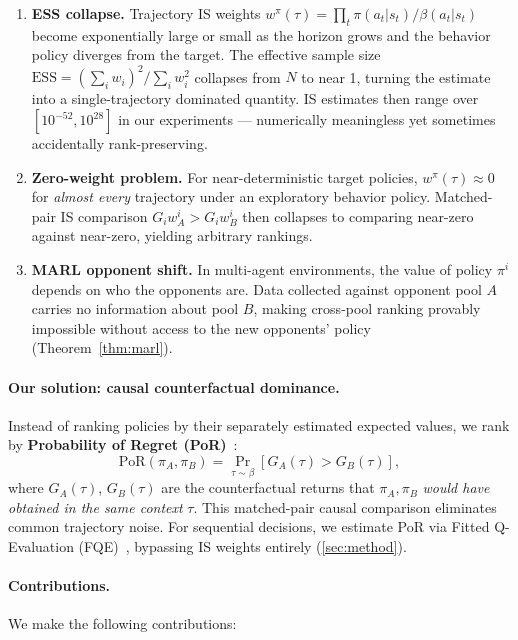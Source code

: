\documentclass[10pt]{article}
\theoremstyle{plain}
\theoremstyle{definition}
\theoremstyle{remark}
\newcommand{\PoR}{\mathrm{PoR}}
\newcommand{\ESS}{\mathrm{ESS}}
\newcommand{\piA}{\pi_A}
\newcommand{\piB}{\pi_B}
\newcommand{\GA}{G_A}
\newcommand{\GB}{G_B}
\begin{document}
\begin{enumerate}
  \item \textbf{ESS collapse.}  Trajectory IS weights
    $w^\pi(\tau)=\prod_t \pi(a_t|s_t)/\beta(a_t|s_t)$ become exponentially
    large or small as the horizon grows and the behavior policy diverges from
    the target.  The effective sample size
    $\ESS = (\sum_i w_i)^2/\sum_i w_i^2$ collapses from $N$ to near 1,
    turning the estimate into a single-trajectory dominated quantity.  IS
    estimates then range over $[10^{-52}, 10^{28}]$ in our experiments ---
    numerically meaningless yet sometimes accidentally rank-preserving.

  \item \textbf{Zero-weight problem.}  For near-deterministic target policies,
    $w^\pi(\tau)\approx 0$ for \emph{almost every} trajectory under an
    exploratory behavior policy.  Matched-pair IS comparison
    $G_i w_A^i > G_i w_B^i$ then collapses to comparing near-zero against
    near-zero, yielding arbitrary rankings.

  \item \textbf{MARL opponent shift.}  In multi-agent environments, the value
    of policy $\pi^i$ depends on who the opponents are.  Data collected
    against opponent pool $A$ carries no information about pool $B$, making
    cross-pool ranking provably impossible without access to the new
    opponents' policy (Theorem~\ref{thm:marl}).
\end{enumerate}

\paragraph{Our solution: causal counterfactual dominance.}
Instead of ranking policies by their separately estimated expected values, we
rank by \textbf{Probability of Regret (PoR)}~\citep{kawakami2025potential}:
\[
  \PoR(\piA,\piB) = \Pr_{\tau\sim\beta}[\GA(\tau) > \GB(\tau)],
\]
where $\GA(\tau)$, $\GB(\tau)$ are the counterfactual returns that $\piA,\piB$
\emph{would have obtained in the same context} $\tau$.  This matched-pair
causal comparison eliminates common trajectory noise.  For sequential
decisions, we estimate PoR via Fitted Q-Evaluation (FQE)~\citep{ernst2005tree},
bypassing IS weights entirely (\cref{sec:method}).

\paragraph{Contributions.}  We make the following contributions:
\end{document}
